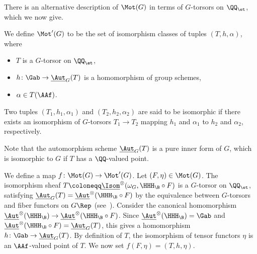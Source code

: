 There is an alternative description of $\Mot(G)$ in terms of $G$-torsors on $\QQ_{\et}$, which we now give.

\begin{definition}
We define $\Mot'(G)$ to be the set of isomorphism classes of tuples $(T,h,\alpha)$, where
\begin{itemize}
\item $T$ is a $G$-torsor on $\QQ_{\et}$,
\item $h\colon \Gab \rightarrow \underline{\Aut}_G(T)$ is a homomorphism of group schemes,
\item $\alpha \in T(\AAf)$.
\end{itemize}
Two tuples $(T_1,h_1,\alpha_1)$ and $(T_2,h_2,\alpha_2)$ are said to be isomorphic if there exists an isomorphism of $G$-torsors $T_1 \rightarrow T_2$ mapping $h_1$ and $\alpha_1$ to $h_2$ and $\alpha_2$, respectively.
\end{definition}

\begin{remark}
Note that the automorphism scheme $\underline{\Aut}_G(T)$ is a pure inner form of $G$, which is isomorphic to $G$ if $T$ has a $\QQ$-valued point.
\end{remark}

We define a map $f\colon \Mot(G) \rightarrow \Mot'(G)$. Let $(F,\eta) \in \Mot(G)$. The isomorphism sheaf $T \coloneqq \underline{\Isom}^{\otimes}(\omega_G,\HHH_{\B} \circ F)$ is a $G$-torsor on $\QQ_{\et}$, satisfying $\underline{\Aut}_G(T) = \underline{\Aut}^{\otimes}(\HHH_{\B} \circ F)$ by the equivalence between $G$-torsors and fiber functors on $G\Rep$ (see~\cite[Proposition~III.3.2.5.3]{SaavedraRivano}). 
%
%
Consider the canonical homomorphism $\underline{\Aut}^{\otimes}(\HHH_{\B}) \rightarrow \underline{\Aut}^{\otimes}(\HHH_{\B} \circ F)$. Since $\underline{\Aut}^{\otimes}(\HHH_{\B}) = \Gab$ and $\underline{\Aut}^{\otimes}(\HHH_{\B} \circ F) = \underline{\Aut}_G(T)$, this gives a homomorphism $h\colon \Gab \rightarrow \underline{\Aut}_G(T)$. By definition of $T$, the isomorphism of tensor functors $\eta$ is an $\AAf$-valued point of $T$. We now set $f(F,\eta) = (T,h,\eta)$.

